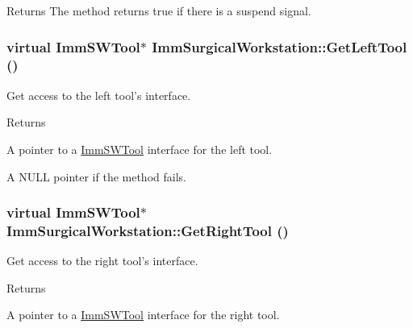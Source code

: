 \begin{DoxyReturn}{Returns}
The method returns true if there is a suspend signal. 
\end{DoxyReturn}
\hypertarget{classImmSurgicalWorkstation_a69564d16bac8c88db28ed7c6ad6e0b4d}{
\subsubsection[{GetLeftTool}]{\setlength{\rightskip}{0pt plus 5cm}virtual {\bf ImmSWTool}$\ast$ ImmSurgicalWorkstation::GetLeftTool ()}}
\label{classImmSurgicalWorkstation_a69564d16bac8c88db28ed7c6ad6e0b4d}
Get access to the left tool's interface.

\begin{DoxyReturn}{Returns}

\end{DoxyReturn}
A pointer to a \hyperlink{classImmSWTool}{ImmSWTool} interface for the left tool.

A NULL pointer if the method fails. \hypertarget{classImmSurgicalWorkstation_a111bb1fc5d84969d91985d73fdeb8cef}{
\subsubsection[{GetRightTool}]{\setlength{\rightskip}{0pt plus 5cm}virtual {\bf ImmSWTool}$\ast$ ImmSurgicalWorkstation::GetRightTool ()}}
\label{classImmSurgicalWorkstation_a111bb1fc5d84969d91985d73fdeb8cef}
Get access to the right tool's interface.

\begin{DoxyReturn}{Returns}

\end{DoxyReturn}
A pointer to a \hyperlink{classImmSWTool}{ImmSWTool} interface for the right tool.


